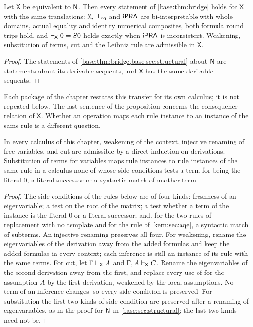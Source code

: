 \begin{proposition}
\label{kern:prop:transfer}
Let $\mathsf{X}$ be equivalent to $\mathsf{N}$.  Then every statement of
\cref{base:thm:bridge} holds for $\mathsf{X}$ with the same translations:
$\mathsf{X}$, $\mathsf{T}_{\mathrm{eq}}$ and $\mathsf{iPRA}$ are bi-interpretable with whole domains,
actual equality and identity numerical composites, both formula round trips
hold, and $\vdash_{\mathsf{X}}0=S 0$ holds exactly when $\mathsf{iPRA}$ is
inconsistent.  Weakening, substitution of terms, cut and the Leibniz rule are
admissible in $\mathsf{X}$.
\end{proposition}

\begin{proof}
The statements of \cref{base:thm:bridge,base:sec:structural} about $\mathsf{N}$ are
statements about its derivable sequents, and $\mathsf{X}$ has the same
derivable sequents.
\end{proof}

Each package of the chapter restates this transfer for its own calculus; it
is not repeated below.  The last sentence of the proposition concerns the
consequence relation of $\mathsf{X}$.  Whether an operation maps each rule
instance to an instance of the same rule is a different question.

\begin{lemma}
\label{kern:lem:struct}
In every calculus of this chapter, weakening of the context, injective
renaming of free variables, and cut are admissible by a direct induction on
derivations.  Substitution of terms for variables maps rule instances to rule
instances of the same rule in a calculus none of whose side conditions tests
a term for being the literal $0$, a literal successor or a syntactic match of
another term.
\end{lemma}

\begin{proof}
The side conditions of the rules below are of four kinds: freshness of an
eigenvariable; a test on the root of the matrix; a test whether a term of the
instance is the literal $0$ or a literal successor; and, for the two rules of
replacement with no template and for the rule  of
\cref{kern:sec:aqe}, a syntactic match of subterms.  An injective renaming preserves all four.  For
weakening, rename the eigenvariables of the derivation away from the added
formulas and keep the added formulas in every context; each inference is
still an instance of its rule with the same terms.  For cut, let
$\Gamma\vdash_{\mathsf{X}}A$ and $\Gamma,A\vdash_{\mathsf{X}}C$.  Rename
the eigenvariables of the second derivation away from the first, and replace
every use of  for the assumption $A$ by the first derivation,
weakened by the local assumptions.  No term of an inference changes, so every
side condition is preserved.  For substitution the first two kinds of side
condition are preserved after a renaming of eigenvariables, as in the proof
for $\mathsf{N}$ in \cref{base:sec:structural}; the last two kinds need not be.
\end{proof}

